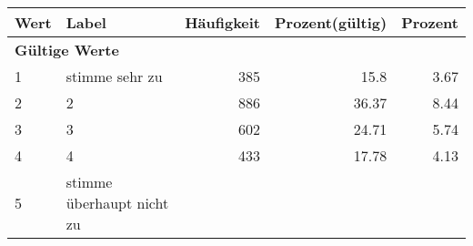      \begin{longtable}{lXrrr}
     \toprule
     \textbf{Wert} & \textbf{Label} & \textbf{Häufigkeit} & \textbf{Prozent(gültig)} & \textbf{Prozent} \\
     \endhead
     \midrule
     \multicolumn{5}{l}{\textbf{Gültige Werte}}\\

     1 &
     \multicolumn{1}{X}{ stimme sehr zu   } &


       \num{385} &
       \num[round-mode=places,round-precision=2]{15.8} &
         \num[round-mode=places,round-precision=2]{3.67} \\

     2 &
     \multicolumn{1}{X}{ 2   } &


       \num{886} &
       \num[round-mode=places,round-precision=2]{36.37} &
         \num[round-mode=places,round-precision=2]{8.44} \\

     3 &
     \multicolumn{1}{X}{ 3   } &


       \num{602} &
       \num[round-mode=places,round-precision=2]{24.71} &
         \num[round-mode=places,round-precision=2]{5.74} \\

     4 &
     \multicolumn{1}{X}{ 4   } &


       \num{433} &
       \num[round-mode=places,round-precision=2]{17.78} &
         \num[round-mode=places,round-precision=2]{4.13} \\

     5 &
     \multicolumn{1}{X}{ stimme überhaupt nicht zu   } &



\end{longtable}
